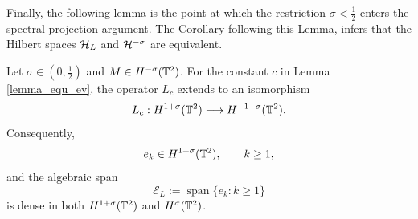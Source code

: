Finally, the following lemma is the point at which the restriction $\sigma<\frac12$ enters the spectral projection argument. The Corollary following this Lemma, infers that the Hilbert spaces $\mathcal{H}_L$ and $\mathcal{H}^{-\sigma}$ are equivalent. 
\begin{lemma}\label{lem:eigenfunction_regularity}
Let $\sigma\in(0,\frac12)$ and $M\in H^{-\sigma}(\mathbb{T}^2)$.  For the
constant $c$ in Lemma \ref{lemma_equ_ev}, the operator $L_c$ extends
to an isomorphism
\begin{equation}\label{eq:Lc_sobolev_isomorphism}
    L_c:H^{1+\sigma}(\mathbb{T}^2)
    \longrightarrow H^{-1+\sigma}(\mathbb{T}^2).
\end{equation}
Consequently,
\[
    e_k\in H^{1+\sigma}(\mathbb{T}^2),
    \qquad k\geq1,
\]
and the algebraic span
\[
    \mathscr E_L:=\operatorname{span}\{e_k:k\geq1\}
\]
is dense in both $H^{1+\sigma}(\mathbb{T}^2)$ and
$H^\sigma(\mathbb{T}^2)$.
\end{lemma}

